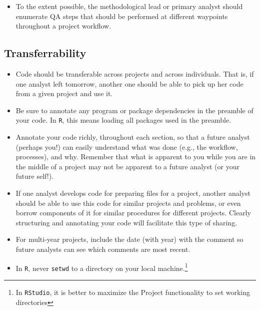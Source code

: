 \begin{itemize}

	\item To the extent possible, the methodological lead or primary analyst should enumerate QA steps that should be performed at different waypoints throughout a project workflow.
\end{itemize}

\subsection{Transferrability}
\begin{itemize}
	\item Code should be transferable across projects and across individuals. That is, if one analyst left tomorrow, another one should be able to pick up her code from a given project and use it.
	\item Be sure to annotate any program or package dependencies in the preamble of your code. In \texttt{R}, this means loading all packages used in the preamble.
	\item Annotate your code richly, throughout each section, so that a future analyst (perhaps you!) can easily understand what was done (e.g., the workflow, processes), and why. Remember that what is apparent to you while you are in the middle of a project may not be apparent to a future analyst (or your future self!).
	\item If one analyst develops code for preparing files for a project, another analyst should be able to use this code for similar projects and problems, or even borrow components of it for similar procedures for different projects. Clearly structuring and annotating your code will facilitate this type of sharing.
	\item For multi-year projects, include the date (with year) with the comment so future analysts can see which comments are most recent.
	\item In \texttt{R}, never \texttt{setwd} to a directory on your local machine.\footnote{In \texttt{RStudio}, it is better to maximize the Project functionality to set working directories}
\end{itemize}

